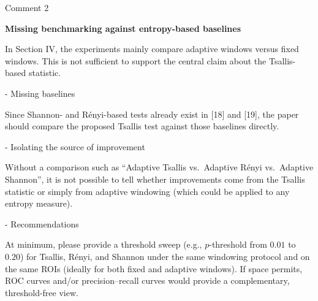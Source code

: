 \documentclass[11pt]{report}
\begin{document}
\begin{reviewbox}{Comment 2}

\textbf{Missing benchmarking against entropy-based baselines}

In Section IV, the experiments mainly compare adaptive windows versus fixed windows. This is not sufficient to support the central claim about the Tsallis-based statistic.

- Missing baselines

Since Shannon- and Rényi-based tests already exist in [18] and [19], the paper should compare the proposed Tsallis test against those baselines directly.

- Isolating the source of improvement

Without a comparison such as ``Adaptive Tsallis vs.\ Adaptive Rényi vs.\ Adaptive Shannon'', it is not possible to tell whether improvements come from the Tsallis statistic or simply from adaptive windowing (which could be applied to any entropy measure).

- Recommendations

At minimum, please provide a threshold sweep (e.g., $p$-threshold from $0.01$ to $0.20$) for Tsallis, Rényi, and Shannon under the same windowing protocol and on the same ROIs (ideally for both fixed and adaptive windows). If space permits, ROC curves and/or precision--recall curves would provide a complementary, threshold-free view.

\end{reviewbox}
\end{document}
